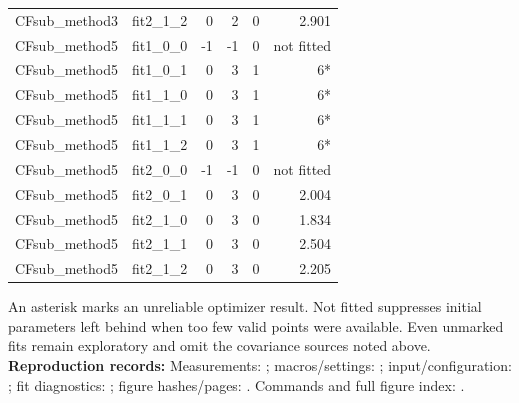 \documentclass[11pt,a4paper]{article}
\begin{document}
{\begin{longtable}{llrrrr}
CFsub\_method3 & fit2\_1\_2 & 0 & 2 & 0 & 2.901\\
CFsub\_method5 & fit1\_0\_0 & -1 & -1 & 0 & not fitted\\
CFsub\_method5 & fit1\_0\_1 & 0 & 3 & 1 & 6*\\
CFsub\_method5 & fit1\_1\_0 & 0 & 3 & 1 & 6*\\
CFsub\_method5 & fit1\_1\_1 & 0 & 3 & 1 & 6*\\
CFsub\_method5 & fit1\_1\_2 & 0 & 3 & 1 & 6*\\
CFsub\_method5 & fit2\_0\_0 & -1 & -1 & 0 & not fitted\\
CFsub\_method5 & fit2\_0\_1 & 0 & 3 & 0 & 2.004\\
CFsub\_method5 & fit2\_1\_0 & 0 & 3 & 0 & 1.834\\
CFsub\_method5 & fit2\_1\_1 & 0 & 3 & 0 & 2.504\\
CFsub\_method5 & fit2\_1\_2 & 0 & 3 & 0 & 2.205\\
\hline\end{longtable}}
An asterisk marks an unreliable optimizer result. Not fitted suppresses initial parameters left behind when too few valid points were available. Even unmarked fits remain exploratory and omit the covariance sources noted above.
{\small\textbf{Reproduction records:} Measurements: ; macros/settings: ; input/configuration: ; fit diagnostics: ; figure hashes/pages: . Commands and full figure index: .}
\end{document}

